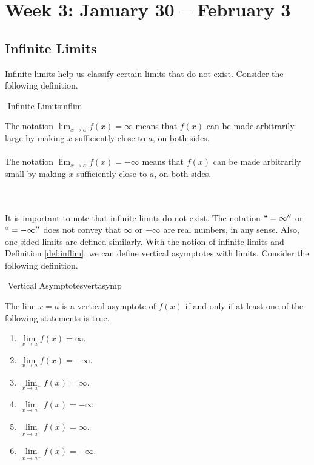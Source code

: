 \pagebreak

\section{Week 3: January 30 -- February 3}

    \subsection{Infinite Limits}

        Infinite limits help us classify certain limits that do not exist. Consider the following definition.
        \begin{definition}{\Stop\,\,Infinite Limits}{inflim}

            The notation \(\lim_{x\to a}f(x)=\infty\) means that \(f(x)\) can be made arbitrarily large by making \(x\) sufficiently close to \(a\), on both sides.
            \\
            \\
            The notation \(\lim_{x\to a}f(x)=-\infty\) means that \(f(x)\) can be made arbitrarily small by making \(x\) sufficiently close to \(a\), on both sides.

        \end{definition}
        \vphantom
        \\
        \\
        It is important to note that infinite limits do not exist. The notation \(``=\infty''\) or \(``=-\infty''\) does not convey that \(\infty\) or \(-\infty\) are real numbers, in any sense. Also, one-sided limits are defined similarly. With the notion of infinite limits and Definition \ref{def:inflim}, we can define vertical asymptotes with limits. Consider the following definition.
        \begin{definition}{\Stop\,\,Vertical Asymptotes}{vertasymp}
            
            The line \(x=a\) is a vertical asymptote of \(f(x)\) if and only if at least one of the following statements is true.
            \begin{enumerate}
                \item \(\lim\limits_{x\to a}f(x)=\infty\).
                \item \(\lim\limits_{x\to a}f(x)=-\infty\).
                \item \(\lim\limits_{x\to a^-}f(x)=\infty\).
                \item \(\lim\limits_{x\to a^-}f(x)=-\infty\).
                \item \(\lim\limits_{x\to a^+}f(x)=\infty\).
                \item \(\lim\limits_{x\to a^+}f(x)=-\infty\).
            \end{enumerate}

        \end{definition}
